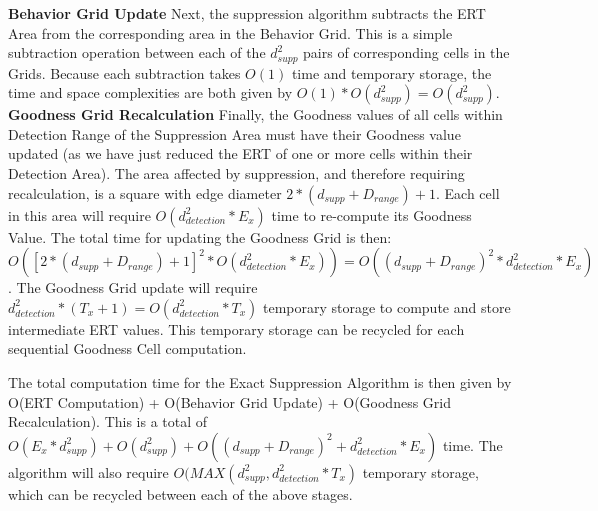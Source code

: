 \textbf{Behavior Grid Update}\newline
Next, the suppression algorithm subtracts the ERT Area from the corresponding area in the Behavior Grid.  This is a simple subtraction operation between each of the $d_{supp}^2$ pairs of corresponding cells in the Grids.  Because each subtraction takes $O(1)$ time and temporary storage, the time and space complexities are both given by $O(1) * O(d_{supp}^2) = O(d_{supp}^2)$.
\textbf{Goodness Grid Recalculation}\newline
Finally, the Goodness values of all cells within Detection Range of the Suppression Area must have their Goodness value updated (as we have just reduced the ERT of one or more cells within their Detection Area).  The area affected by suppression, and therefore requiring recalculation, is a square with edge diameter $2 * (d_{supp} + D_{range}) + 1$.  Each cell in this area will require  $O(d_{detection}^2 * E_x)$ time to re-compute its Goodness Value.  The total time for updating the Goodness Grid is then: $O([2 * (d_{supp} + D_{range}) + 1]^2 * O(d_{detection}^2 * E_x)) = O((d_{supp} + D_{range})^2 * d_{detection}^2 * E_x)$.  The Goodness Grid update will require $d_{detection}^2 * (T_x + 1) = O(d_{detection}^2 * T_x)$ temporary storage to compute and store intermediate ERT values.  This temporary storage can be recycled for each sequential Goodness Cell computation.


The total computation time for the Exact Suppression Algorithm is then given by O(ERT Computation) + O(Behavior Grid Update) + O(Goodness Grid Recalculation). This is a total of $O(E_{x} * d_{supp}^2) + O(d_{supp}^2) + O((d_{supp} + D_{range})^2 + d_{detection}^2 * E_x)$ time.  The algorithm will also require $O(MAX(d_{supp}^2 , d_{detection}^2 * T_x)$ temporary storage, which can be recycled between each of the above stages.
